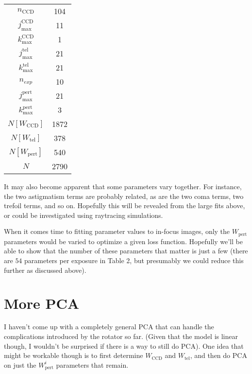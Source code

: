 \documentclass{article}
\begin{document}
\begin{table}[ht]
    \center
    \label{tab:2}
    \begin{tabular}{c|c}
        \hline
        $n_\mathrm{CCD}$ & 104 \\
        $j^\mathrm{CCD}_\mathrm{max}$ & 11 \\
        $k^\mathrm{CCD}_\mathrm{max}$ & 1 \\
        $j^\mathrm{tel}_\mathrm{max}$ & 21 \\
        $k^\mathrm{tel}_\mathrm{max}$ & 21 \\
        $n_{exp}$ & 10 \\
        $j^\mathrm{pert}_\mathrm{max}$ & 21 \\
        $k^\mathrm{pert}_\mathrm{max}$ & 3 \\
        \hline
        $N[W_\mathrm{CCD}]$ & 1872 \\
        $N[W_\mathrm{tel}]$ & 378 \\
        $N[W_\mathrm{pert}]$ & 540 \\
        \hline
        $N$ & 2790
    \end{tabular}
\end{table}

It may also become apparent that some parameters vary together.  For instance, the two astigmatism
terms are probably related, as are the two coma terms, two trefoil terms, and so on.  Hopefully this
will be revealed from the large fits above, or could be investigated using raytracing simulations.

When it comes time to fitting parameter values to in-focus images, only the $W_\mathrm{pert}$
parameters would be varied to optimize a given loss function.  Hopefully we'll be able to show that
the number of these parameters that matter is just a few (there are $54$ parameters per exposure in
Table 2, but presumably we could reduce this further as discussed above).

\section{More PCA}

I haven't come up with a completely general PCA that can handle the complications introduced by the
rotator so far.  (Given that the model is linear though, I wouldn't be surprised if there is a way
to still do PCA).  One idea that might be workable though is to first determine $W_\mathrm{CCD}$ and
$W_\mathrm{tel}$, and then do PCA on just the $W^i_\mathrm{pert}$ parameters that remain.
\end{document}
